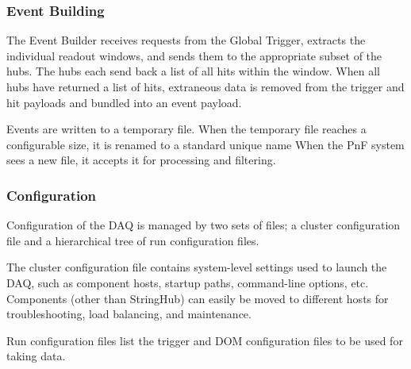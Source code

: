 
\subsubsection{\label{sect:online:evbuilder}Event Building}

The Event Builder receives requests from the Global Trigger, extracts
the individual readout windows, and sends them to the appropriate subset of the
hubs.  The hubs each send back a list of all hits within the window.  When all
hubs have returned a list of hits, extraneous data is removed from the trigger
and hit payloads and bundled into an event payload.

Events are written to a temporary file.  When the temporary
file reaches a configurable size, it is renamed to a standard unique name
When the PnF system sees a new file, it accepts it for
processing and filtering.


\subsubsection{Configuration}

Configuration of the DAQ is managed by two sets of files; a cluster
configuration file and a hierarchical tree of run configuration files.

The cluster configuration file contains system-level settings used to launch
the DAQ, such as component hosts, startup paths, command-line options, etc.
Components
(other than StringHub) can easily be moved to different hosts for
troubleshooting, load balancing, and maintenance.

Run configuration files list the trigger and DOM configuration files to be
used for taking data.

